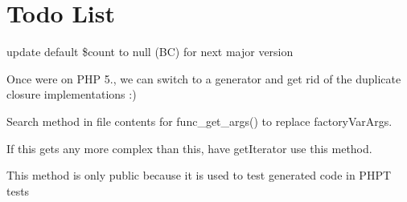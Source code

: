 \chapter{Todo List}
\hypertarget{todo}{}\label{todo}

\begin{DoxyRefList}
\item[Global \doxylink{class_faker_1_1_provider_1_1_base_a33578c6f9cb75a9dd5943154df8727d3}{Base\+::random\+Elements} (\$array=\mbox{[}\textquotesingle{}a\textquotesingle{}, \textquotesingle{}b\textquotesingle{}, \textquotesingle{}c\textquotesingle{}\mbox{]}, \$count=1, \$allow\+Duplicates=false)]\label{todo__todo000002}%
%
update default \$count to {\ttfamily null} (BC) for next major version 
\item[Class \doxylink{class_psy_1_1_execution_loop_closure}{Execution\+Loop\+Closure} ]\label{todo__todo000015}%
%
Once we\textquotesingle{}re on PHP 5., we can switch  to a generator and get rid of the duplicate closure implementations \+:)  
\item[Class \doxylink{class_factory_method}{Factory\+Method} ]\label{todo__todo000008}%
%
Search method in file contents for func\+\_\+get\+\_\+args() to replace factory\+Var\+Args.  
\item[Global \doxylink{class_whoops_1_1_exception_1_1_frame_collection_a3f86c2f58955e5100b8411ab13927232}{Frame\+Collection\+::get\+Array} ()]\label{todo__todo000005}%
%
If this gets any more complex than this, have get\+Iterator use this method.  
\item[Global \doxylink{class_p_h_p_unit_1_1_framework_1_1_mock_object_1_1_generator_1_1_generator_ae5e8ee95cf3406c19cc54c6ec08ad297}{Generator\+::generate} (string \$type, bool \$mock\+Object, array \$methods=null, string \$mock\+Class\+Name=\textquotesingle{}\textquotesingle{}, bool \$call\+Original\+Clone=true, bool \$call\+Autoload=true, bool \$clone\+Arguments=true, bool \$call\+Original\+Methods=false)]\label{todo__todo000010}%
%
This method is only public because it is used to test generated code in PHPT tests 
\item[Global \doxylink{class_whoops_1_1_exception_1_1_inspector_acf0fa98548c6a73a611c1955b3f9fd94}{Inspector\+::get\+Previous\+Exception\+Inspector} ()]\label{todo__todo000006}%
%

\end{DoxyRefList}
